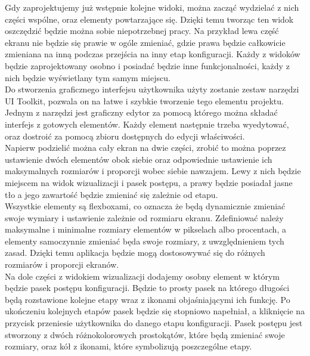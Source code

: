 \documentclass{article} %
\begin{document}
            
            Gdy zaprojektujemy już wstępnie kolejne widoki, można zacząć wydzielać z nich części wspólne, oraz elementy powtarzające się. Dzięki temu tworząc ten widok oszczędzić będzie można sobie niepotrzebnej pracy. Na przykład lewa część ekranu nie będzie się prawie w ogóle zmieniać, gdzie prawa będzie całkowicie zmieniana na inną podczas przejścia na inny etap konfiguracji. Każdy z widoków będzie zaprojektowany osobno i posiadać będzie inne funkcjonalności, każdy z nich będzie wyświetlany tym samym miejscu. 
            \\
            
            Do stworzenia graficznego interfejsu użytkownika użyty zostanie zestaw narzędzi UI Toolkit, pozwala on na łatwe i szybkie tworzenie tego elementu projektu. Jednym z narzędzi jest graficzny edytor za pomocą którego można składać interfejs z gotowych elementów. Każdy element następnie trzeba wyedytować, oraz dostroić za pomocą zbioru dostępnych do edycji właściwości.
            \\
            
            Napierw podzielić można cały ekran na dwie części, zrobić to można poprzez ustawienie dwóch elementów obok siebie oraz odpowiednie ustawienie ich maksymalnych rozmiarów i proporcji wobec siebie nawzajem. Lewy z nich będzie miejscem na widok wizualizacji i pasek postępu, a prawy będzie posiadał jasne tło a jego zawartość będzie zmieniać się zależnie od etapu. 
            \\
            
            Wszystkie elementy są flexboxami, co oznacza że będą dynamicznie zmieniać swoje wymiary i ustawienie zależnie od rozmiaru ekranu. Zdefiniować należy maksymalne i minimalne rozmiary elementów w pikselach albo procentach, a elementy samoczynnie zmieniać będa swoje rozmiary, z uwzględnieniem tych zasad. Dzięki temu aplikacja będzie mogą dostosowywać się do różnych rozmiarów i proporcji ekranów.
            \\
            
            Na dole części z widokiem wizualizacji dodajemy osobny element w którym będzie pasek postępu konfiguracji. Będzie to prosty pasek na którego długości będą rozstawione kolejne etapy wraz z ikonami objaśniającymi ich funkcję. Po ukończeniu kolejnych etapów pasek będzie się stopniowo napełniał, a kliknięcie na przycisk przeniesie użytkownika do danego etapu konfiguracji. Pasek postępu jest stworzony z dwóch różnokolorowych prostokątów, które będą zmieniać swoje rozmiary, oraz kół z ikonami, które symbolizują poszczególne etapy.
            \\
            
\end{document}
